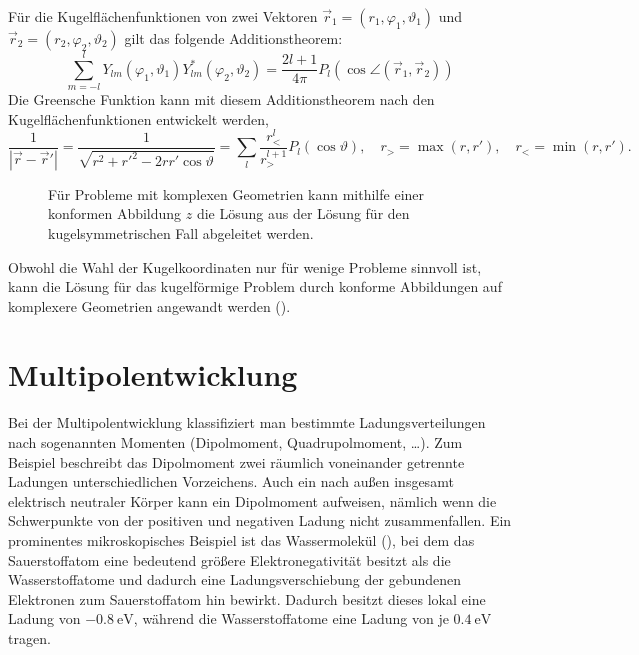 Für die Kugelflächenfunktionen von zwei Vektoren $\vec {r}_{1}=\left(r_{1},\varphi _{1},\vartheta _{1}\right)$ und $\vec {r}_{2}=\left(r_{2},\varphi _{2},\vartheta _{2}\right)$ gilt das folgende Additionstheorem:
\begin{equation*}
	\sum _{m=-l}^{l}Y_{lm}\left(\varphi _{1},\vartheta _{1}\right)Y_{lm}^{*}\left(\varphi _{2},\vartheta _{2}\right)=\frac{2l+1}{4\pi }P_{l}\left(\cos \angle \left(\vec {r}_{1},\vec {r}_{2}\right)\right)
\end{equation*}
Die Greensche Funktion kann mit diesem Additionstheorem nach den Kugelflächenfunktionen entwickelt werden,
\begin{equation*}
	\frac{1}{\left| \vec {r}-\vec {r}'\right| }=\frac{1}{\sqrt{r^{2}+r'^{2}-2rr'\cos \vartheta }}=\sum _{l}\frac{r_{<}^{l}}{r_{>}^{l+1}}P_{l}\left(\cos \vartheta \right),\quad
	r_{>}=\max \left(r,r'\right) ,\quad
	r_{<}=\min \left(r,r'\right).
\end{equation*}


\begin{figure}[htb]
	\centering
	\tfigComplexProblemsConformalMap
	\caption{Für Probleme mit komplexen Geometrien kann mithilfe einer konformen Abbildung $z$ die Lösung aus der Lösung für den kugelsymmetrischen Fall abgeleitet werden. }
	\label{fig:complex_problems_conformal_map}
\end{figure}

Obwohl die Wahl der Kugelkoordinaten nur für wenige Probleme sinnvoll ist, kann die Lösung für das kugelförmige Problem durch konforme Abbildungen auf komplexere Geometrien angewandt werden ().

\section{Multipolentwicklung}

Bei der Multipolentwicklung klassifiziert man bestimmte Ladungsverteilungen nach sogenannten Momenten (Dipolmoment, Quadrupolmoment, {\ldots}). Zum Beispiel beschreibt das Dipolmoment zwei räumlich voneinander getrennte Ladungen unterschiedlichen Vorzeichens. Auch ein nach außen insgesamt elektrisch neutraler Körper kann ein Dipolmoment aufweisen, nämlich wenn die Schwerpunkte von der positiven und negativen Ladung nicht zusammenfallen. Ein prominentes mikroskopisches Beispiel ist das Wassermolekül (), bei dem das Sauerstoffatom eine bedeutend größere Elektronegativität besitzt als die Wasserstoffatome und dadurch eine Ladungsverschiebung der gebundenen Elektronen zum Sauerstoffatom hin bewirkt. Dadurch besitzt dieses lokal eine Ladung von $\SI{-0.8}{\eV}$, während die Wasserstoffatome eine Ladung von je $\SI{+0.4}{\eV}$ tragen.

